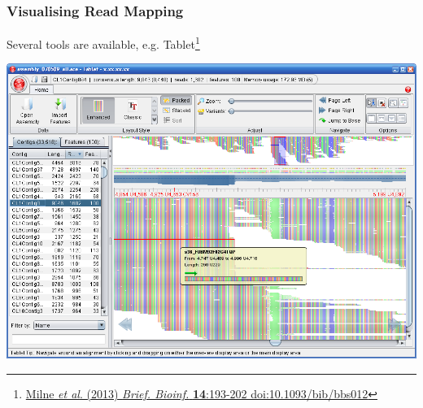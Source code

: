\begin{frame}
  \frametitle{Visualising Read Mapping}
  Several tools are available, e.g. Tablet\footnote{\tiny{\href{http://dx.doi.org/10.1093/bib/bbs012}{Milne \textit{et al}. (2013) \textit{Brief. Bioinf.} \textbf{14}:193-202 doi:10.1093/bib/bbs012}}}
  \begin{center}
    \includegraphics[height=0.65\textheight]{images/tablet1}
  \end{center}  
\end{frame}
